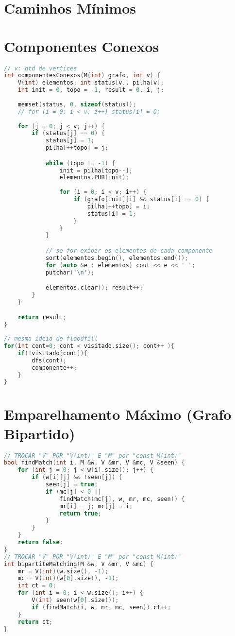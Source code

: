 \newpage

\section{Caminhos Mínimos}


\section{Componentes Conexos}
\begin{lstlisting}[language=C++, title={Versão 1}]
// v: qtd de vertices
int componentesConexos(M(int) grafo, int v) {
	V(int) elementos; int status[v], pilha[v];
    int init = 0, topo = -1, result = 0, i, j;
    
    memset(status, 0, sizeof(status));
	// for (i = 0; i < v; i++) status[i] = 0;
	
    for (j = 0; j < v; j++)	{
		if (status[j] == 0) {
			status[j] = 1;
			pilha[++topo] = j;

			while (topo != -1) {
				init = pilha[topo--];
				elementos.PUB(init);
				
				for (i = 0; i < v; i++)	{
					if (grafo[init][i] && status[i] == 0) {
						pilha[++topo] = i;
						status[i] = 1;
					}
				}
			}

			// se for exibir os elementos de cada componente
			sort(elementos.begin(), elementos.end());
            for (auto &e : elementos) cout << e << ' ';
			putchar('\n');

			elementos.clear(); result++;
		}
	}

	return result;
}
\end{lstlisting}

\begin{lstlisting}[language=C++, title={v2}]
// mesma ideia de floodfill
for(int cont=0; cont < visitado.size(); cont++ ){
	if(!visitado[cont]){
		dfs(cont);
		componente++;
	}
}
\end{lstlisting}

\newpage

\section{Emparelhamento Máximo (Grafo Bipartido)}
\begin{lstlisting}[language=C++]
// TROCAR "V" POR "V(int)" E "M" por "const M(int)"
bool findMatch(int i, M &w, V &mr, V &mc, V &seen) {
    for (int j = 0; j < w[i].size(); j++) {
    	if (w[i][j] && !seen[j]) {
    		seen[j] = true;
            if (mc[j] < 0 || 
            	findMatch(mc[j], w, mr, mc, seen)) {
                mr[i] = j; mc[j] = i;
                return true;
            }
    	}
    }
    return false;
}
// TROCAR "V" POR "V(int)" E "M" por "const M(int)"
int bipartiteMatching(M &w, V &mr, V &mc) {
    mr = V(int)(w.size(), -1);
    mc = V(int)(w[0].size(), -1);
    int ct = 0;
    for (int i = 0; i < w.size(); i++) {
    	V(int) seen(w[0].size());
    	if (findMatch(i, w, mr, mc, seen)) ct++;
    }
    return ct;
}
\end{lstlisting}